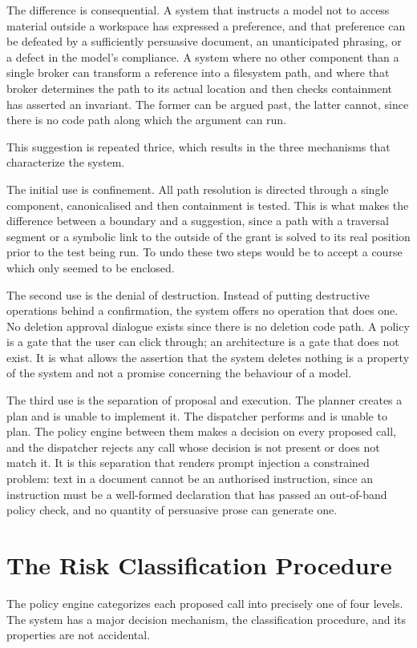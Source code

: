 \documentclass{FastFyp}
\begin{document}
The difference is consequential. A system that instructs a model not to access material outside a workspace has expressed a preference, and that preference can be defeated by a sufficiently persuasive document, an unanticipated phrasing, or a defect in the model's compliance. A system where no other component than a single broker can transform a reference into a filesystem path, and where that broker determines the path to its actual location and then checks containment has asserted an invariant. The former can be argued past, the latter cannot, since there is no code path along which the argument can run.

This suggestion is repeated thrice, which results in the three mechanisms that characterize the system.

The initial use is confinement. All path resolution is directed through a single component, canonicalised and then containment is tested. This is what makes the difference between a boundary and a suggestion, since a path with a traversal segment or a symbolic link to the outside of the grant is solved to its real position prior to the test being run. To undo these two steps would be to accept a course which only seemed to be enclosed.

The second use is the denial of destruction. Instead of putting destructive operations behind a confirmation, the system offers no operation that does one. No deletion approval dialogue exists since there is no deletion code path. A policy is a gate that the user can click through; an architecture is a gate that does not exist. It is what allows the assertion that the system deletes nothing is a property of the system and not a promise concerning the behaviour of a model.

The third use is the separation of proposal and execution. The planner creates a plan and is unable to implement it. The dispatcher performs and is unable to plan. The policy engine between them makes a decision on every proposed call, and the dispatcher rejects any call whose decision is not present or does not match it. It is this separation that renders prompt injection a constrained problem: text in a document cannot be an authorised instruction, since an instruction must be a well-formed declaration that has passed an out-of-band policy check, and no quantity of persuasive prose can generate one.

\section{The Risk Classification Procedure}
The policy engine categorizes each proposed call into precisely one of four levels. The system has a major decision mechanism, the classification procedure, and its properties are not accidental.
\end{document}
